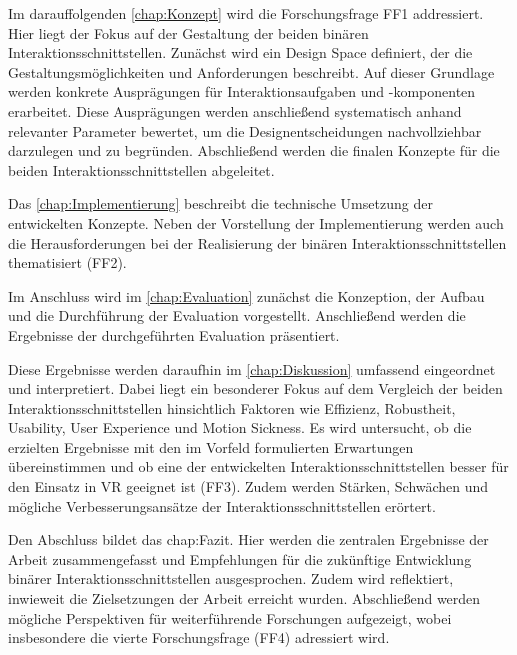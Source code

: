 Im darauffolgenden \autoref{chap:Konzept} wird die Forschungsfrage FF1 addressiert. Hier liegt der Fokus auf der Gestaltung der beiden binären Interaktionsschnittstellen. Zunächst wird ein Design Space definiert, der die Gestaltungsmöglichkeiten und Anforderungen beschreibt. Auf dieser Grundlage werden konkrete Ausprägungen für Interaktionsaufgaben und -komponenten erarbeitet. Diese Ausprägungen werden anschließend systematisch anhand relevanter Parameter bewertet, um die Designentscheidungen nachvollziehbar darzulegen und zu begründen. Abschließend werden die finalen Konzepte für die beiden Interaktionsschnittstellen abgeleitet.

Das \autoref{chap:Implementierung} beschreibt die technische Umsetzung der entwickelten Konzepte. Neben der Vorstellung der Implementierung werden auch die Herausforderungen bei der Realisierung der binären Interaktionsschnittstellen thematisiert (FF2).

Im Anschluss wird im \autoref{chap:Evaluation} zunächst die Konzeption, der Aufbau und die Durchführung der Evaluation vorgestellt. Anschließend werden die Ergebnisse der durchgeführten Evaluation präsentiert.

Diese Ergebnisse werden daraufhin im \autoref{chap:Diskussion} umfassend eingeordnet und interpretiert. Dabei liegt ein besonderer Fokus auf dem Vergleich der beiden Interaktionsschnittstellen hinsichtlich Faktoren wie Effizienz, Robustheit, Usability, User Experience und Motion Sickness. Es wird untersucht, ob die erzielten Ergebnisse mit den im Vorfeld formulierten Erwartungen übereinstimmen und ob eine der entwickelten Interaktionsschnittstellen besser für den Einsatz in VR geeignet ist (FF3). Zudem werden Stärken, Schwächen und mögliche Verbesserungsansätze der Interaktionsschnittstellen erörtert.

Den Abschluss bildet das {chap:Fazit}. Hier werden die zentralen Ergebnisse der Arbeit zusammengefasst und Empfehlungen für die zukünftige Entwicklung binärer Interaktionsschnittstellen ausgesprochen. Zudem wird reflektiert, inwieweit die Zielsetzungen der Arbeit erreicht wurden. Abschließend werden mögliche Perspektiven für weiterführende Forschungen aufgezeigt, wobei insbesondere die vierte Forschungsfrage (FF4) adressiert wird.
